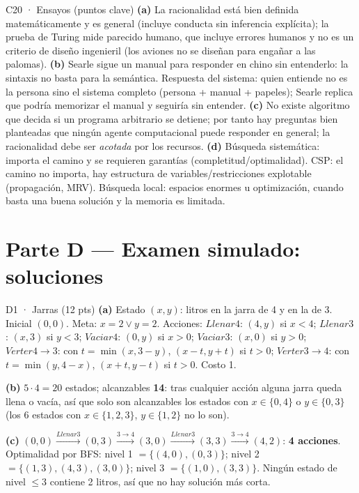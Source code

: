 \begin{solucion}{C20 · Ensayos (puntos clave)}
\textbf{(a)} La racionalidad está bien definida matemáticamente y es general (incluye conducta sin
inferencia explícita); la prueba de Turing mide parecido humano, que incluye errores humanos y no es un
criterio de diseño ingenieril (los aviones no se diseñan para engañar a las palomas).
\textbf{(b)} Searle sigue un manual para responder en chino sin entenderlo: la sintaxis no basta para la
semántica. Respuesta del sistema: quien entiende no es la persona sino el sistema completo (persona +
manual + papeles); Searle replica que podría memorizar el manual y seguiría sin entender.
\textbf{(c)} No existe algoritmo que decida si un programa arbitrario se detiene; por tanto hay preguntas
bien planteadas que ningún agente computacional puede responder en general; la racionalidad debe ser
\emph{acotada} por los recursos.
\textbf{(d)} Búsqueda sistemática: importa el camino y se requieren garantías (completitud/optimalidad).
CSP: el camino no importa, hay estructura de variables/restricciones explotable (propagación, MRV).
Búsqueda local: espacios enormes u optimización, cuando basta una buena solución y la memoria es limitada.
\end{solucion}

\newpage
\section{Parte D — Examen simulado: soluciones}

\begin{solucion}{D1 · Jarras (12 pts)}
\textbf{(a)} Estado $(x,y)$: litros en la jarra de 4 y en la de 3. Inicial $(0,0)$. Meta: $x=2\vee y=2$.
Acciones: $\textit{Llenar4}$: $(4,y)$ si $x<4$; $\textit{Llenar3}$: $(x,3)$ si $y<3$; $\textit{Vaciar4}$: $(0,y)$ si $x>0$;
$\textit{Vaciar3}$: $(x,0)$ si $y>0$; $\textit{Verter4}{\to}3$: con $t=\min(x,3-y)$, $(x-t,y+t)$ si $t>0$; $\textit{Verter3}{\to}4$:
con $t=\min(y,4-x)$, $(x+t,y-t)$ si $t>0$. Costo 1.

\textbf{(b)} $5\cdot4=20$ estados; alcanzables \textbf{14}: tras cualquier acción alguna jarra queda llena o vacía,
así que solo son alcanzables los estados con $x\in\{0,4\}$ o $y\in\{0,3\}$ (los 6 estados con $x\in\{1,2,3\}$, $y\in\{1,2\}$ no lo son).

\textbf{(c)} $(0,0)\xrightarrow{\textit{Llenar3}}(0,3)\xrightarrow{3\to4}(3,0)\xrightarrow{\textit{Llenar3}}(3,3)\xrightarrow{3\to4}(4,2)$: \textbf{4 acciones}.
Optimalidad por BFS: nivel 1 $=\{(4,0),(0,3)\}$; nivel 2 $=\{(1,3),(4,3),(3,0)\}$; nivel 3 $=\{(1,0),(3,3)\}$.
Ningún estado de nivel $\le3$ contiene 2 litros, así que no hay solución más corta.
\end{solucion}

